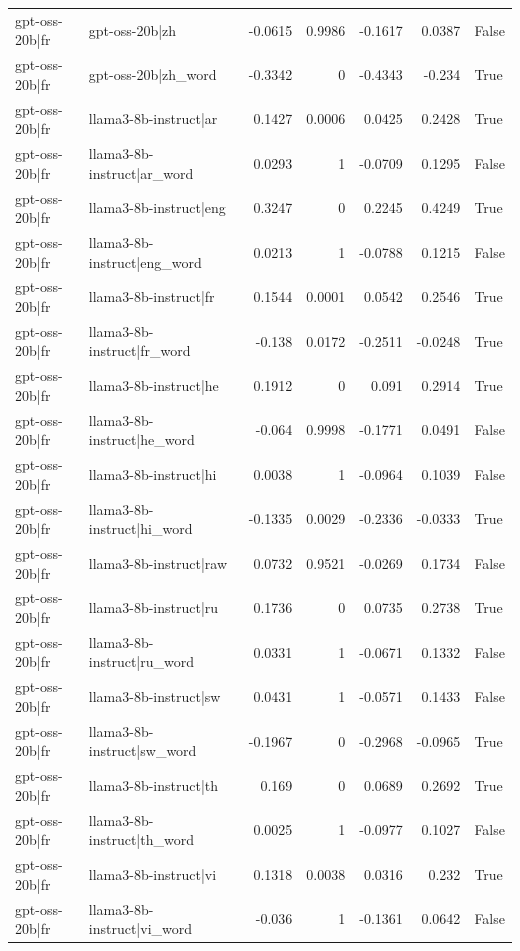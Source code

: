 \begin{table}
\begin{tabular}{l l r r r r l}
gpt-oss-20b|fr & gpt-oss-20b|zh & -0.0615 & 0.9986 & -0.1617 & 0.0387 & False \\
gpt-oss-20b|fr & gpt-oss-20b|zh_word & -0.3342 & 0 & -0.4343 & -0.234 & True \\
gpt-oss-20b|fr & llama3-8b-instruct|ar & 0.1427 & 0.0006 & 0.0425 & 0.2428 & True \\
gpt-oss-20b|fr & llama3-8b-instruct|ar_word & 0.0293 & 1 & -0.0709 & 0.1295 & False \\
gpt-oss-20b|fr & llama3-8b-instruct|eng & 0.3247 & 0 & 0.2245 & 0.4249 & True \\
gpt-oss-20b|fr & llama3-8b-instruct|eng_word & 0.0213 & 1 & -0.0788 & 0.1215 & False \\
gpt-oss-20b|fr & llama3-8b-instruct|fr & 0.1544 & 0.0001 & 0.0542 & 0.2546 & True \\
gpt-oss-20b|fr & llama3-8b-instruct|fr_word & -0.138 & 0.0172 & -0.2511 & -0.0248 & True \\
gpt-oss-20b|fr & llama3-8b-instruct|he & 0.1912 & 0 & 0.091 & 0.2914 & True \\
gpt-oss-20b|fr & llama3-8b-instruct|he_word & -0.064 & 0.9998 & -0.1771 & 0.0491 & False \\
gpt-oss-20b|fr & llama3-8b-instruct|hi & 0.0038 & 1 & -0.0964 & 0.1039 & False \\
gpt-oss-20b|fr & llama3-8b-instruct|hi_word & -0.1335 & 0.0029 & -0.2336 & -0.0333 & True \\
gpt-oss-20b|fr & llama3-8b-instruct|raw & 0.0732 & 0.9521 & -0.0269 & 0.1734 & False \\
gpt-oss-20b|fr & llama3-8b-instruct|ru & 0.1736 & 0 & 0.0735 & 0.2738 & True \\
gpt-oss-20b|fr & llama3-8b-instruct|ru_word & 0.0331 & 1 & -0.0671 & 0.1332 & False \\
gpt-oss-20b|fr & llama3-8b-instruct|sw & 0.0431 & 1 & -0.0571 & 0.1433 & False \\
gpt-oss-20b|fr & llama3-8b-instruct|sw_word & -0.1967 & 0 & -0.2968 & -0.0965 & True \\
gpt-oss-20b|fr & llama3-8b-instruct|th & 0.169 & 0 & 0.0689 & 0.2692 & True \\
gpt-oss-20b|fr & llama3-8b-instruct|th_word & 0.0025 & 1 & -0.0977 & 0.1027 & False \\
gpt-oss-20b|fr & llama3-8b-instruct|vi & 0.1318 & 0.0038 & 0.0316 & 0.232 & True \\
gpt-oss-20b|fr & llama3-8b-instruct|vi_word & -0.036 & 1 & -0.1361 & 0.0642 & False \\

\end{tabular}
\end{table}
